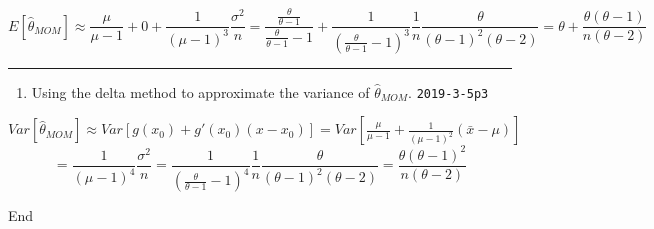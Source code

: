 \documentclass[12pt,]{article}
\newenvironment{Shaded}{\begin{snugshade}}{\end{snugshade}}
\newcommand{\NormalTok}[1]{#1}
\providecommand{\tightlist}{%
  \setlength{\itemsep}{0pt}\setlength{\parskip}{0pt}}
\begin{document}
\[E[\hat\theta_{MOM}]\approx \frac{\mu}{\mu-1}+0+\frac{1}{(\mu-1)^3}\frac{\sigma^2}n=\frac{\frac\theta{\theta-1}}{\frac\theta{\theta-1}-1}+\frac{1}{(\frac\theta{\theta-1}-1)^3}\frac1n\frac{\theta}{(\theta-1)^2(\theta-2)}=\theta+\frac{\theta(\theta-1)}{n(\theta-2)}\]

\begin{center}\rule{0.5\linewidth}{\linethickness}\end{center}

\begin{enumerate}
\def\labelenumi{\alph{enumi}.}
\setcounter{enumi}{2}
\tightlist
\item
  \textcolor[rgb]{0.5,0.5,0.5}{Using the delta method to approximate the variance of $\hat\theta_{MOM}$.}
  \texttt{2019-3-5p3}
\end{enumerate}

\(Var[\hat\theta_{MOM}]\approx Var[g(x_0)+g'(x_0)(x-x_0)]=Var[\frac{\mu}{\mu-1}+\frac{1}{(\mu-1)^2}(\bar x-\mu)]\)
\[=\frac{1}{(\mu-1)^4}\frac{\sigma^2}n=\frac{1}{(\frac\theta{\theta-1}-1)^4}\frac1n\frac{\theta}{(\theta-1)^2(\theta-2)}=\frac{\theta(\theta-1)^2}{n(\theta-2)}\]

\begin{Shaded}
\begin{Highlighting}[]
\NormalTok{End}
\end{Highlighting}
\end{Shaded}
\end{document}

